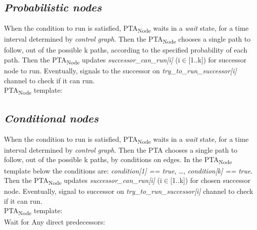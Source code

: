 \subsection{\textit{Probabilistic nodes}}
When the condition to run is satisfied, PTA\textsubscript{Node} waits in a \textcolor{ColorUppaalState}{\textit{wait}} state, for a time interval determined by \textit{control graph}. Then the PTA\textsubscript{Node} chooses a single path to follow, out of the possible k paths, according to the specified probability of each path. Then the PTA\textsubscript{Node} updates \textcolor{ColorEdgeGuard}{\textit{successor_can_run[i]}} (i$\in$[1..k]) for successor node to run. Eventually, signals to the successor on \textcolor{ColorUppaalChannel}{\textit{try_to_run_successor[i]}} channel to check if it can run. \\
PTA\textsubscript{Node} template:\\
 \clearpage
\subsection{\textit{Conditional nodes}}
When the condition to run is satisfied, PTA\textsubscript{Node} waits in a \textcolor{ColorUppaalState}{\textit{wait}} state, for a time interval determined by \textit{control graph}. Then the PTA chooses a single path to follow, out of the possible k paths, by conditions on edges. In the PTA\textsubscript{Node} template below the conditions are: \textcolor{ColorEdgeGuard}{\textit{condition[1] == true}}, …, \textcolor{ColorEdgeGuard}{\textit{condition[k] == true}}. Then the PTA\textsubscript{Node} updates \textcolor{ColorEdgeGuard}{\textit{successor_can_run[i]}} (i$\in$[1..k]) for chosen successor node. Eventually, signal to successor on \textcolor{ColorUppaalChannel}{\textit{try_to_run_successor[i]}} channel to check if it can run.\\
PTA\textsubscript{Node} template:\\
 {Wait for Any direct predecessors: }{} \clearpage
